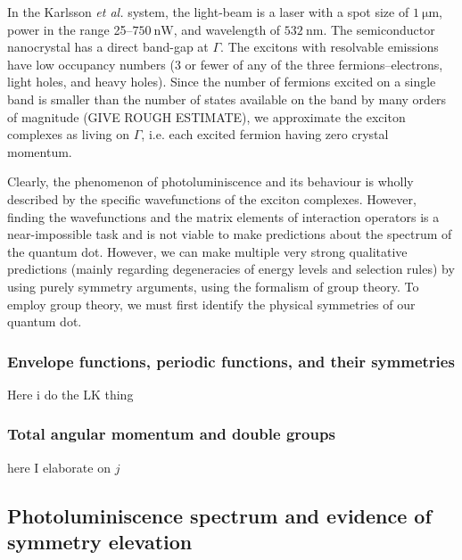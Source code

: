 In the Karlsson \textit{et al.} system, the light-beam is a laser with a spot size of $\SI{1}{\micro\metre}$, power in the range 25--$\SI{750}{\nano\watt}$, and wavelength of $\SI{532}{\nano\metre}$. The semiconductor nanocrystal has a direct band-gap at $\Gamma$. The excitons with resolvable emissions have low occupancy numbers (3 or fewer of any of the three fermions--electrons, light holes, and heavy holes). Since the number of fermions excited on a single band is smaller than the number of states available on the band by many orders of magnitude (GIVE ROUGH ESTIMATE), we approximate the exciton complexes as living on $\Gamma$, i.e. each excited fermion having zero crystal momentum.

Clearly, the phenomenon of photoluminiscence and its behaviour is wholly described by the specific wavefunctions of the exciton complexes. However, finding the wavefunctions and the matrix elements of interaction operators is a near-impossible task and is not viable to make predictions about the spectrum of the quantum dot. However, we can make multiple very strong qualitative predictions (mainly regarding degeneracies of energy levels and selection rules) by using purely symmetry arguments, using the formalism of group theory. To employ group theory, we must first identify the physical symmetries of our quantum dot.

\subsubsection{Envelope functions, periodic functions, and their symmetries}
Here i do the LK thing

\subsubsection{Total angular momentum and double groups}
here I elaborate on $j$

\subsection{Photoluminiscence spectrum and evidence of symmetry elevation}

